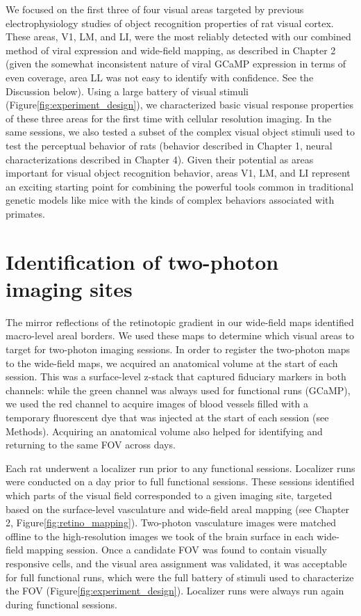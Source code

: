 We focused on the first three of four visual areas targeted by previous electrophysiology studies of object recognition properties of rat visual cortex. These areas, V1, LM, and LI, were the most reliably detected with our combined method of viral expression and wide-field mapping, as described in Chapter 2 (given the somewhat inconsistent nature of viral GCaMP expression in terms of even coverage, area LL was not easy to identify with confidence. See the Discussion below). Using a large battery of visual stimuli (Figure\ref{fig:experiment_design}), we characterized basic visual response properties of these three areas for the first time with cellular resolution imaging. In the same sessions, we also tested a subset of the complex visual object stimuli used to test the perceptual behavior of rats (behavior described in Chapter 1, neural characterizations described in Chapter 4). Given their potential as areas important for visual object recognition behavior, areas V1, LM, and LI  represent an exciting starting point for combining the powerful tools common in traditional genetic models like mice with the kinds of complex behaviors associated with primates.  

\section{Identification of two-photon imaging sites}
The mirror reflections of the retinotopic gradient in our wide-field maps identified macro-level areal borders. We used these maps to determine which visual areas to target for two-photon imaging sessions. In order to register the two-photon maps to the wide-field maps, we acquired an anatomical volume at the start of each session. This was a surface-level z-stack that captured fiduciary markers in both channels: while the green channel was always used for functional runs (GCaMP), we used the red channel to acquire images of blood vessels filled with a temporary fluorescent dye that was injected at the start of each session (see Methods). Acquiring an anatomical volume also helped for identifying and returning to the same FOV across days. 

Each rat underwent a localizer run prior to any functional sessions. Localizer runs were conducted on a day prior to full functional sessions. These sessions identified which parts of the visual field corresponded to a given imaging site, targeted based on the surface-level vasculature and wide-field areal mapping (see Chapter 2, Figure\ref{fig:retino_mapping}). Two-photon vasculature images were matched offline to the high-resolution images we took of the brain surface in each wide-field mapping session. Once a candidate FOV was found to contain visually responsive cells, and the visual area assignment was validated, it was acceptable for full functional runs, which were the full battery of stimuli used to characterize the FOV (Figure\ref{fig:experiment_design}). Localizer runs were always run again during functional sessions.

